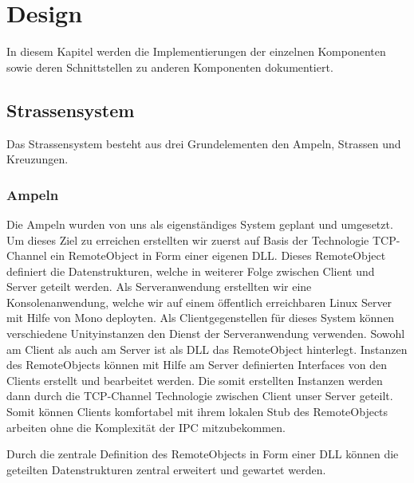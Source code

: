 
\chapter{Design}
\label{Design}

In diesem Kapitel werden die Implementierungen der einzelnen Komponenten sowie deren Schnittstellen zu anderen Komponenten dokumentiert.



\thispagestyle{standard}
\pagestyle{standard}

\section{Strassensystem}
\label{Strassensystem}

Das Strassensystem besteht aus drei Grundelementen den Ampeln, Strassen und Kreuzungen.

\subsection{Ampeln}

Die Ampeln wurden von uns als eigenständiges System geplant und umgesetzt. Um dieses Ziel zu erreichen erstellten wir zuerst auf Basis der Technologie TCP-Channel ein RemoteObject in Form einer eigenen DLL. Dieses RemoteObject definiert die Datenstrukturen, welche in weiterer Folge zwischen Client und Server geteilt werden. Als Serveranwendung erstellten wir eine Konsolenanwendung, welche wir auf einem öffentlich erreichbaren Linux Server mit Hilfe von Mono deployten. Als Clientgegenstellen für dieses System können verschiedene Unityinstanzen den Dienst der Serveranwendung verwenden. Sowohl am Client als auch am Server ist als DLL das RemoteObject hinterlegt. Instanzen des RemoteObjects können mit Hilfe am Server definierten Interfaces von den Clients erstellt und bearbeitet werden. Die somit erstellten Instanzen werden dann durch die TCP-Channel Technologie zwischen Client unser Server geteilt. Somit können Clients komfortabel mit ihrem lokalen Stub des RemoteObjects arbeiten ohne die Komplexität der IPC mitzubekommen. 

Durch die zentrale Definition des RemoteObjects in Form einer DLL können die geteilten Datenstrukturen zentral erweitert und gewartet werden.

